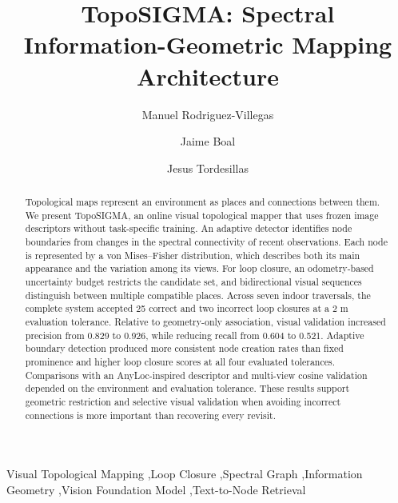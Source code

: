 \documentclass[5p,twocolumn,nonatbib,reversenotenum]{elsarticle}
\newcommand{\methodname}{TopoSIGMA\xspace}
\begin{document}
\begin{frontmatter}

\title{\methodname: Spectral Information-Geometric Mapping Architecture}

\author[1]{Manuel Rodriguez-Villegas}
\author[2]{Jaime Boal}
\author[2]{Jesus Tordesillas}


\begin{abstract}
    Topological maps represent an environment as places and connections between them. We present \methodname, an online visual topological mapper that uses frozen image descriptors without task-specific training. An adaptive detector identifies node boundaries from changes in the spectral connectivity of recent observations. Each node is represented by a von Mises--Fisher distribution, which describes both its main appearance and the variation among its views. For loop closure, an odometry-based uncertainty budget restricts the candidate set, and bidirectional visual sequences distinguish between multiple compatible places. Across seven indoor traversals, the complete system accepted 25 correct and two incorrect loop closures at a 2 m evaluation tolerance. Relative to geometry-only association, visual validation increased precision from 0.829 to 0.926, while reducing recall from 0.604 to 0.521. Adaptive boundary detection produced more consistent node creation rates than fixed prominence and higher loop closure scores at all four evaluated tolerances. Comparisons with an AnyLoc-inspired descriptor and multi-view cosine validation depended on the environment and evaluation tolerance. These results support geometric restriction and selective visual validation when avoiding incorrect connections is more important than recovering every revisit.
\end{abstract}

\begin{keyword}
Visual Topological Mapping \sep Loop Closure \sep Spectral Graph \sep Information Geometry \sep Vision Foundation Model \sep Text-to-Node Retrieval
\end{keyword}

\end{frontmatter}
\end{document}
